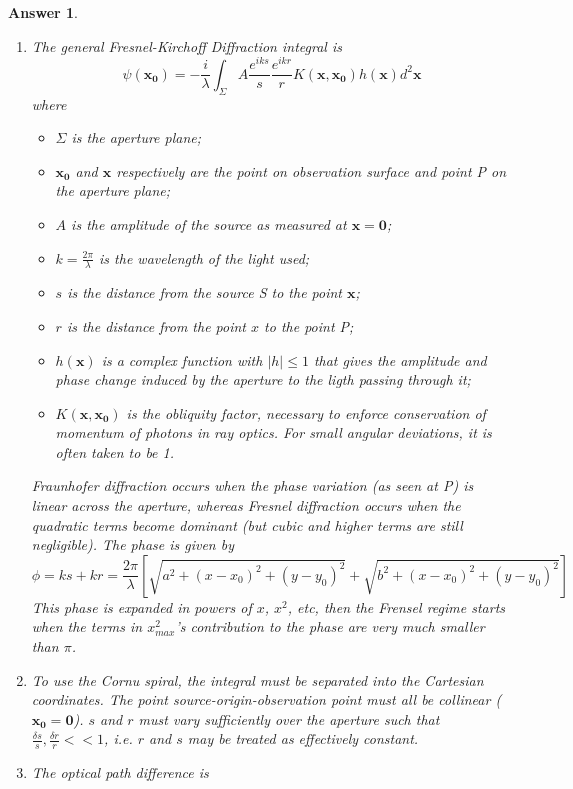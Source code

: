 \documentclass[a4paper]{article}
\newtheorem{ans}{Answer}[subsection]
\theoremstyle{new}
\begin{document}
\begin{ans}\leavevmode
\begin{enumerate}[label=(\roman*)]
\item The general Fresnel-Kirchoff Diffraction integral is
$$\psi(\mathbf{x_0})=-\frac{i}{\lambda}\int_\Sigma A\frac{e^{iks}}{s}\frac{e^{ikr}}{r}K(\mathbf{x},\mathbf{x_0})h(\mathbf{x})d^2\mathbf{x}$$
where
\begin{itemize}
    \item $\Sigma$ is the aperture plane;
    \item $\mathbf{x_0}$ and $\mathbf{x}$ respectively are the point on observation surface and point P on the aperture plane;
    \item $A$ is the amplitude of the source as measured at $\mathbf{x}=\boldsymbol{0}$;
    \item $k=\frac{2\pi}{\lambda}$ is the wavelength of the light used;
    \item $s$ is the distance from the source S to the point $\mathbf{x}$;
    \item $r$ is the distance from the point $x$ to the point P;
    \item $h(\mathbf{x})$ is a complex function with $|h|\leq1$ that gives the amplitude and phase change induced by the aperture to the ligth passing through it;
    \item $K(\mathbf{x},\mathbf{x_0})$ is the obliquity factor, necessary to enforce conservation of momentum of photons in ray optics. For small angular deviations, it is often taken to be 1.
\end{itemize}
Fraunhofer diffraction occurs when the phase variation (as seen at P) is linear across the aperture, whereas Fresnel diffraction occurs when the quadratic terms become dominant (but cubic and higher terms are still negligible). The phase is given by
$$\phi=ks+kr=\frac{2\pi}{\lambda}[\sqrt{a^2+(x-x_0)^2+(y-y_0)^2}+\sqrt{b^2+(x-x_0)^2+(y-y_0)^2}]$$
This phase is expanded in powers of $x$, $x^2$, etc, then the Frensel regime starts when the terms in $x^2_{max}$'s contribution to the phase are very much smaller than $\pi$.
\item To use the Cornu spiral, the integral must be separated into the Cartesian coordinates. The point source-origin-observation point must all be collinear ($\mathbf{x_0}=\boldsymbol{0}$). $s$ and $r$ must vary sufficiently over the aperture such that $\frac{\delta s}{s},\frac{\delta r}{r}<<1$, i.e. $r$ and $s$ may be treated as effectively constant.
\item The optical path difference is 

\end{enumerate}
\end{ans}
\end{document}
